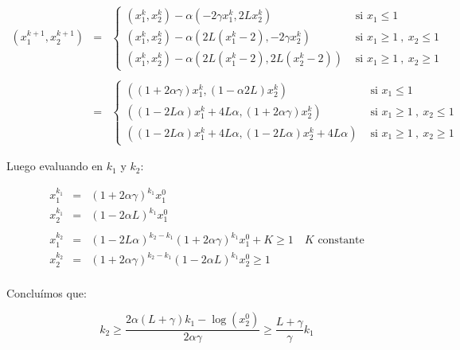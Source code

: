 \begin{remark}
	\begin{equation*}
	\begin{array}{rcl}
	\left(x_1^{k+1}, x^{k+1}_2\right) & = & \left\lbrace\begin{array}{cc}
	\left(x^k_1, x^k_2\right)- \alpha\left(-2 \gamma x^k_1, 2Lx^k_2\right) & \text{ si } x_1 \leq 1\\
	\left(x^k_1, x^k_2\right)- \alpha\left(2L \left(x_1^k -2\right), -2 \gamma x^k_2\right) & \text{ si } x_1 \geq 1 \ , \ x_2 \leq 1 \\
	\left(x^k_1, x^k_2\right)- \alpha\left(2L \left(x_1^k -2\right), 2L \left(x_2^k -2\right)\right) & \text{ si } x_1 \geq 1 \ , \ x_2 \geq 1
	\end{array}\right. \\
	&&\\
	& = &\left\lbrace\begin{array}{cc}
	\left(\left(1 + 2\alpha \gamma \right)x^k_1, \left(1 - \alpha 2L\right)x^k_2\right) & \text{ si } x_1 \leq 1\\
	\left(\left(1 - 2L \alpha \right)x^k_1 + 4L \alpha, \left(1 + 2 \alpha \gamma \right)x^k_2\right) & \text{ si } x_1 \geq 1 \ , \ x_2 \leq 1 \\
	\left(\left(1 - 2L \alpha \right)x^k_1 + 4L \alpha, \left(1 - 2L \alpha \right)x^k_2 + 4L \alpha\right)  & \text{ si } x_1 \geq 1 \ , \ x_2 \geq 1
	\end{array}\right.
	\end{array}
	\end{equation*}
	
	Luego evaluando en $k_1$ y $k_2$:
	
	\begin{equation*}
	\begin{array}{rcl}
	x^{k_1}_1 & = & \left(1 + 2 \alpha \gamma\right)^{k_1} x^0_1 \\
	x^{k_1}_2 & = & \left(1 - 2 \alpha L\right)^{k_1} x^0_1 \\
	&&\\
	x^{k_2}_1 & = & \left(1 - 2L\alpha\right)^{k_2 - k_1}\left(1 + 2 \alpha \gamma\right)^{k_1} x^0_1 + K\geq 1 \quad K \text{ constante}\\
	x^{k_2}_2 & = & \left(1 + 2 \alpha \gamma\right)^{k_2-k_1}\left(1 - 2 \alpha L\right)^{k_1} x^0_2\geq 1 \\
	\end{array}
	\end{equation*}
	
	Conclu\'imos que:
	
	\begin{equation}
		k_2 \geq \dfrac{2 \alpha \left(L + \gamma\right)k_1 - \log\left(x_2^0\right)}{2 \alpha \gamma} \geq \dfrac{L + \gamma}{\gamma} k_1 
	\end{equation}
	

\end{remark}
